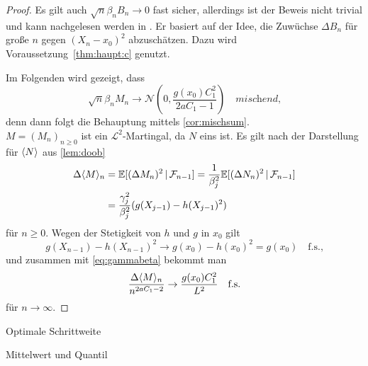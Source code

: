 \documentclass[ngerman,a4paper,11pt]{scrartcl}
\newcommand{\EE}{\mathbb{E}}
\newcommand{\ff}{\mathcal{F}}
\renewcommand{\ll}{\mathcal{L}}
\newcommand{\nn}{\mathcal{N}}
\newcommand{\condexp}[2]{\EE[#1\,|\,#2]}
\DeclarePairedDelimiter{\sprod}{\langle}{\rangle}	%
\begin{document}
\begin{proof}
Es gilt auch
$\sqrt{n}\beta_nB_n\to 0$ fast sicher, allerdings ist der Beweis nicht trivial
und kann nachgelesen werden in \cite[Satz~11.4]{lpw}. Er basiert auf der Idee,
die Zuwüchse $\Delta B_n$ für große $n$ gegen $(X_n-x_0)^2$ abzuschätzen. Dazu
wird Voraussetzung~\ref{thm:haupt:c} genutzt.

Im Folgenden wird gezeigt, dass
\begin{equation*}
 \sqrt{n}\beta_nM_n\to\nn\left( 0,\frac{g(x_0)C_1^2}{2aC_1-1} \right)\quad\textit{mischend,}
\end{equation*}
denn dann folgt die Behauptung mittels \cref{cor:mischsum}. \\
$M=(M_n)_{n\geq 0}$
ist ein $\ll^2$-Martingal, da $N$ eins ist. Es gilt nach der Darstellung für
$\sprod{N}$ aus \cref{lem:doob}
\begin{align*}
 \Delta\sprod{M}_n&=\condexp{(\Delta M_n)^2}{\ff_{n-1}}=\frac{1}{\beta_j^2}\condexp{(\Delta N_n)^2}{\ff_{n-1}}\\
&=\frac{\gamma_j^2}{\beta_j^2}(g(X_{j-1})-h(X_{j-1})^2)
\end{align*}
für $n\geq 0$. Wegen der Stetigkeit von $h$ und $g$ in $x_0$ gilt
\begin{equation*}
 g(X_{n-1})-h(X_{n-1})^2\to g(x_0)-h(x_0)^2=g(x_0)\quad\text{f.s.,}
\end{equation*}
und zusammen mit \cref{eq:gammabeta} bekommt man
\begin{equation*}
 \frac{\Delta\sprod{M}_n}{n^{2aC_1-2}}\to\frac{g(x_0)C_1^2}{L^2}\quad\text{f.s.} 
\end{equation*}
für $n\to\infty$.
\end{proof}
\begin{rem}
 Optimale Schrittweite 
\end{rem}
\begin{exmp}
 Mittelwert und Quantil 
\end{exmp}
\printbibliography
\end{document}
